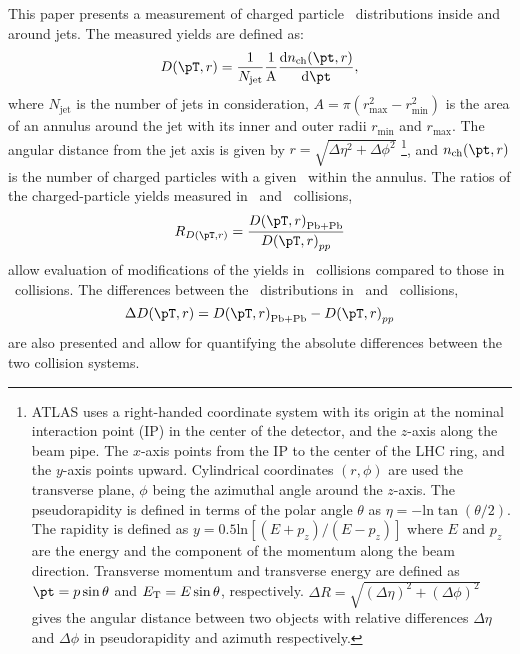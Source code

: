 This paper presents a measurement of charged particle \pt\ distributions inside and around jets. The measured yields are defined as:
  \begin{equation}
  \Dptr = \frac{1}{N_{\mathrm{jet}}} \frac{1}{\mathrm{A}} \frac{\mathrm{d} n_{\mathrm{ch}} (\pt, r)}{\mathrm{d} \pt},
\end{equation}
where $N_{\mathrm{jet}}$ is the number of jets in consideration, $A = \pi (r_{\mathrm{max}}^2 - r_{\mathrm{min}}^2) $ is the area of an annulus around the jet with its inner and outer radii $r_{\mathrm{min}}$ and $r_{\mathrm{max}}$. The angular distance from the jet axis is given by $r = \sqrt{\Delta \eta^2 + \Delta \phi^2}$ \footnote{ATLAS uses a right-handed coordinate system with its origin at the nominal interaction point (IP) in the center of the detector, and the $z$-axis along the beam pipe. The $x$-axis points from the IP to the center of the LHC ring, and the $y$-axis points upward. Cylindrical coordinates $(r, \phi)$ are used the transverse plane, $\phi$ being the azimuthal angle around the $z$-axis. The pseudorapidity is defined in terms of the polar angle $\theta$ as $\eta = - \text{ln} \tan (\theta/2)$. The rapidity is defined as $y = 0.5\text{ln}[(E + p_z)/(E-p_z)]$ where $E$ and $p_z$ are the energy and the component of the momentum along the beam direction.  Transverse momentum and transverse energy are defined as $\pt = p \sin\theta$ and $\mbox{$E_{\mathrm{T}}$} = E \sin\theta$, respectively. $\Delta R = \sqrt{(\Delta \eta )^2 + (\Delta \phi)^2}$ gives the angular distance between two objects with relative differences $\Delta \eta$ and $\Delta \phi$ in pseudorapidity and azimuth respectively.}, and $n_{\mathrm{ch}}(\pt, r)$ is the number of charged particles with a given \pt\ within the annulus. The ratios of the charged-particle yields measured in \pbpb\ and \pp\ collisions,
\begin{equation}
   \RDptr = \frac{\Dptr_\mathrm{Pb+Pb}}{\Dptr_{pp}}
   \label{eq:rdptr}
\end{equation}
allow evaluation of modifications of the yields in \pbpb\ collisions compared to those in \pp\ collisions. The differences between the \Dptr\ distributions in \pbpb\ and \pp\ collisions, 
\begin{equation}
   \Delta \Dptr = \Dptr_\mathrm{Pb+Pb} - \Dptr_{pp}
   \label{eq:deltadptr}
\end{equation}
 are also presented and allow for quantifying the absolute differences between the two collision systems. 

